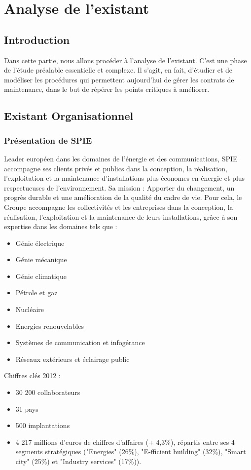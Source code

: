 \chapter{Analyse de l’existant}

\section{Introduction}
Dans cette partie, nous allons procéder à l'analyse de l'existant. C'est une phase de l'étude préalable essentielle et complexe. Il s'agit, en fait, d'étudier et de modéliser les procédures qui permettent aujourd'hui de gérer les contrats de maintenance, dans le but de répérer les points critiques à améliorer.

\section{Existant Organisationnel}

\subsection{Présentation de SPIE}
        Leader européen dans les domaines de l'énergie et des communications, SPIE accompagne ses clients privés et publics dans la conception, la réalisation, l'exploitation et la maintenance d'installations plus économes en énergie et plus respectueuses de l'environnement.
        Sa mission : Apporter du changement, un progrès durable et une amélioration de la qualité du cadre de vie.
        Pour cela, le Groupe accompagne les collectivités et les entreprises dans la conception, la réalisation, l'exploitation et la maintenance de leurs installations, grâce à son expertise dans les domaines tels que :
    \begin{itemize}
        \item Génie électrique
        \item Génie mécanique
        \item Génie climatique
        \item Pétrole et gaz
        \item Nucléaire
        \item Energies renouvelables
        \item Systèmes de communication et infogérance
        \item Réseaux extérieurs et éclairage public
    \end{itemize}
    \bigbreak
    Chiffres clés 2012 :
    \begin{itemize}
        \item 30 200 collaborateurs
        \item 31 pays
        \item 500 implantations
        \item 4 217 millions d'euros de chiffres d'affaires (+ 4,3\%), répartis entre ses 4 segments stratégiques ("Energies" (26\%), "E-fficient building" (32\%), "Smart city" (25\%) et "Industry services" (17\%)).
    \end{itemize}


